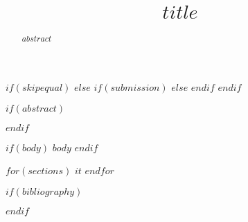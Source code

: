 \documentclass{article}
\title{$title$}
\begin{document}
\maketitle

$if(skipequal)$
$else$
$if(submission)$
$else$
$endif$
$endif$

$if(abstract)$
\begin{abstract}
$abstract$
\end{abstract}
$endif$

$if(body)$
$body$
$endif$

$for(sections)$
$it$
$endfor$

$if(bibliography)$
\clearpage


$endif$


\end{document}
